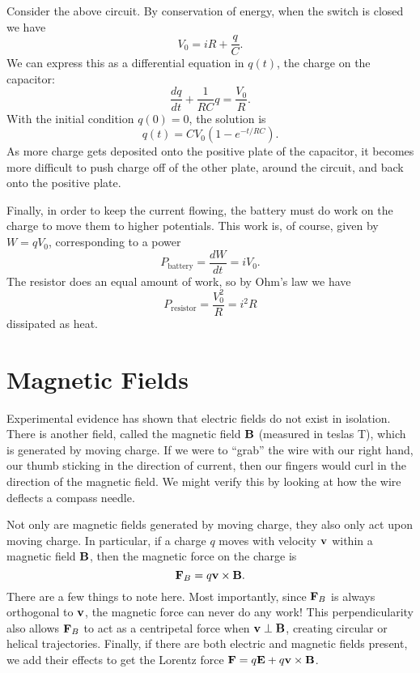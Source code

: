 \documentclass[../p051main.tex]{subfiles}
\begin{document}
\begin{example}
    Consider the above circuit.
    By conservation of energy, when the switch is closed we have
    \[ V_0 = iR + \frac{q}{C}. \]
    We can express this as a differential equation in $q(t)$, the charge on the capacitor:
    \[ \frac{dq}{dt} + \frac{1}{RC}q = \frac{V_0}{R}. \]
    With the initial condition $q(0) = 0$, the solution is
    \[ q(t) = CV_0 \left( 1 - e^{-t / RC} \right). \]
    As more charge gets deposited onto the positive plate of the capacitor, it becomes more difficult to push charge off of the other plate, around the circuit, and back onto the positive plate.
\end{example}

Finally, in order to keep the current flowing, the battery must do work on the charge to move them to higher potentials.
This work is, of course, given by $W = qV_0$, corresponding to a power
\[ P_\textrm{battery} = \frac{dW}{dt} = iV_0. \]
The resistor does an equal amount of work, so by Ohm's law we have
\[ P_\textrm{resistor} = \frac{V_0^2}{R} = i^2R \]
dissipated as heat.

\section{Magnetic Fields}
Experimental evidence has shown that electric fields do not exist in isolation.
There is another field, called the magnetic field $\mathbf{B}$ (measured in teslas T), which is generated by moving charge.
If we were to ``grab'' the wire with our right hand, our thumb sticking in the direction of current, then our fingers would curl in the direction of the magnetic field.
We might verify this by looking at how the wire deflects a compass needle.

Not only are magnetic fields generated by moving charge, they also only act upon moving charge.
In particular, if a charge $q$ moves with velocity $\mathbf{v}$ within a magnetic field $\mathbf{B}$, then the magnetic force on the charge is
\[ \mathbf{F}_B = q\mathbf{v} \times \mathbf{B}. \]
There are a few things to note here.
Most importantly, since $\mathbf{F}_B$ is always orthogonal to $\mathbf{v}$, the magnetic force can never do any work!
This perpendicularity also allows $\mathbf{F}_B$ to act as a centripetal force when $\mathbf{v} \perp \mathbf{B}$, creating circular or helical trajectories.
Finally, if there are both electric and magnetic fields present, we add their effects to get the Lorentz force $\mathbf{F} = q\mathbf{E} + q\mathbf{v} \times \mathbf{B}$.
\end{document}
